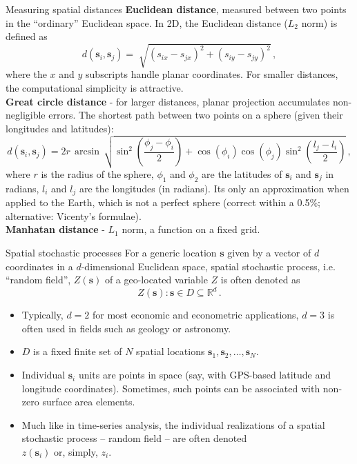 \documentclass{beamer}
\begin{document}
\begin{frame}{Measuring spatial distances}
\small{\textbf{Euclidean distance}, measured between two points in the ``ordinary'' Euclidean space. In 2D, the Euclidean distance ($L_2$ norm) is defined as 
$$
d(\bm{s}_i, \bm{s}_j) = \sqrt[]{(s_{ix}-s_{jx})^2+(s_{iy}-s_{jy})^2}\,,
$$
where the $x$ and $y$ subscripts handle planar coordinates. For smaller distances, the computational simplicity is attractive.\\
\medskip
\textbf{Great circle distance} - for larger distances, planar projection accumulates non-negligible errors. The shortest path between two points on a sphere (given their longitudes and latitudes): 
$$
d(\bm{s}_i, \bm{s}_j) = 2r \, \arcsin \,
 \sqrt{ \sin^2 \left( \frac{\phi_j-\phi_i}{2} \right)
       + \cos(\phi_i) \cos(\phi_j)
       \sin^2 \left( \frac{l_j-l_i}{2} \right) }\,,
$$
where $r$ is the radius of the sphere, $\phi_1$ and $\phi_2$ are the latitudes of $\bm{s}_i$ and $\bm{s}_j$ in radians, $l_i$ and $l_j$ are the longitudes (in radians). Its only an approximation when applied to the Earth, which is not a perfect sphere (correct within a 0.5\%; alternative: Vicenty's formulae).\\
\medskip
\textbf{Manhatan distance} - $L_1$ norm, a function on a fixed grid.
}
\end{frame}
\begin{frame}{Spatial stochastic processes}
For a generic location $\bm{s}$ given by a vector of $d$ coordinates in a $d$-dimensional Euclidean space, spatial stochastic process, i.e. ``random field'', $Z(\bm{s})$ of a geo-located variable $Z$ is often denoted as
$$ Z(\bm{s}): \bm{s} \in D \subseteq \mathbb{R}^d \, .$$
\vspace{-0.5cm}
\begin{itemize}
    \item Typically, $d=2$ for most economic and econometric applications, $d=3$ is often used in fields such as geology or astronomy. 
    \smallskip
    \item $D$ is a fixed finite set of $N$ spatial locations $\bm{s}_1, \bm{s}_2, \dots, \bm{s}_N$. 
    \smallskip
    \item Individual $\bm{s}_i$ units are points in space (say, with GPS-based latitude and longitude coordinates). Sometimes, such points can be associated with non-zero surface area elements.
    \item Much like in time-series analysis, the individual realizations of a spatial stochastic process -- random field -- are often denoted \\$z(\bm{s}_i)$ or, simply, $z_i$.
\end{itemize}
\end{frame}
\end{document}
